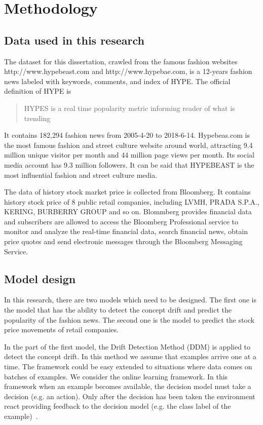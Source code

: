 \section{Methodology}
\subsection{Data used in this research}
The dataset for this dissertation, crawled from the famous fashion websites http://www.hypebeast.com and http://www.hypebae.com, is a 12-years fashion news labeled with keywords, comments, and index of HYPE. The official definition of HYPE is 

\begin{quote}
HYPES is a real time popularity metric informing reader of what is trending
\end{quote}

It contains 182,294 fashion news from 2005-4-20 to 2018-6-14. Hypebeas.com is the most famous fashion and street culture website around world, attracting 9.4 million unique visitor per month and 44 million page views per month. Its social media account has 9.3 million followers. It can be said that HYPEBEAST is the most influential fashion and street culture media.

The data of history stock market price is collected from Bloomberg. It contains history stock price of 8 public retail companies, including LVMH, PRADA S.P.A., KERING, BURBERRY GROUP and so on. Blommberg provides financial data and subscribers are allowed to access the Bloomberg Professional service to monitor and analyze the real-time financial data, search financial news, obtain price quotes and send electronic messages through the Bloomberg Messaging Service.

\subsection{Model design}
In this research, there are two models which need to be designed. The first one is the model that has the ability to detect the concept drift and predict the popularity of the fashion news. The second one is the model to predict the stock price movements of retail companies. 

In the part of the first model, the Drift Detection Method (DDM) is applied to detect the concept drift. In this method we assume that examples arrive one at a time. The framework could be easy extended to situations where data comes on batches of examples. We consider the online learning framework. In this framework when an example becomes available, the decision model must take a decision (e.g. an action). Only after the decision has been taken the environment react providing feedback to the decision model (e.g. the class label of the example)~\cite{gama2004learning}.

